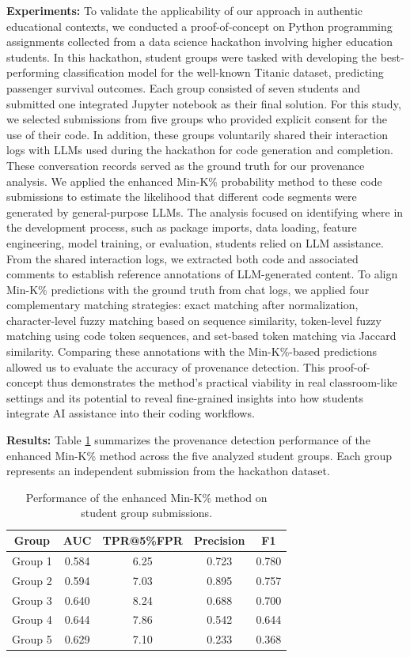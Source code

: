 \documentclass[runningheads]{llncs}
\begin{document}
\noindent \textbf{Experiments:} To validate the applicability of our approach in authentic educational contexts, we conducted a proof-of-concept on Python programming assignments collected from a data science hackathon involving higher education students. In this hackathon, student groups were tasked with developing the best-performing classification model for the well-known Titanic dataset, predicting passenger survival outcomes. Each group consisted of seven students and submitted one integrated Jupyter notebook as their final solution. For this study, we selected submissions from five groups who provided explicit consent for the use of their code. In addition, these groups voluntarily shared their interaction logs with LLMs used during the hackathon for code generation and completion. These conversation records served as the ground truth for our provenance analysis. We applied the enhanced Min-K\% probability method to these code submissions to estimate the likelihood that different code segments were generated by general-purpose LLMs. The analysis focused on identifying where in the development process, such as package imports, data loading, feature engineering, model training, or evaluation, students relied on LLM assistance. From the shared interaction logs, we extracted both code and associated comments to establish reference annotations of LLM-generated content. To align Min-K\% predictions with the ground truth from chat logs, we applied four complementary matching strategies: exact matching after normalization, character-level fuzzy matching based on sequence similarity, token-level fuzzy matching using code token sequences, and set-based token matching via Jaccard similarity. Comparing these annotations with the Min-K\%-based predictions allowed us to evaluate the accuracy of provenance detection. This proof-of-concept thus demonstrates the method’s practical viability in real classroom-like settings and its potential to reveal fine-grained insights into how students integrate AI assistance into their coding workflows.

\noindent \textbf{Results:} Table \ref{stud} summarizes the provenance detection performance of the enhanced Min-K\% method across the five analyzed student groups. Each group represents an independent submission from the hackathon dataset. 

\begin{table}[h] \centering \caption{Performance of the enhanced Min-K\% method on student group submissions.} 
\label{stud}
\begin{tabular}{|c|c|c|c|c|} 
\hline 
\textbf{Group} & \textbf{AUC} & \textbf{TPR@5\%FPR} & \textbf{Precision} & \textbf{F1} \\ \hline 
Group 1 & 0.584 & 6.25 & 0.723 & 0.780 \\ 
Group 2 & 0.594 & 7.03 & 0.895 & 0.757 \\ 
Group 3 & 0.640 & 8.24 & 0.688 & 0.700 \\ 
Group 4 & 0.644 & 7.86 & 0.542 & 0.644 \\ 
Group 5 & 0.629 & 7.10 & 0.233 & 0.368 \\ \hline 
\end{tabular} 
\end{table}
\end{document}
